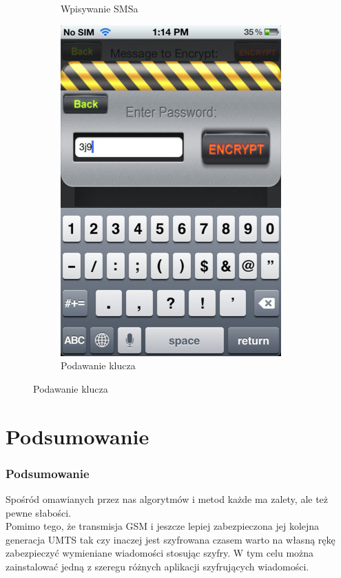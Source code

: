 \documentclass[xcolor=table]{beamer}
\begin{document}
\begin{frame}
\begin{center}
\begin{figure}
\begin{subfigure}[b]{0.4\textwidth}
              \caption{Wpisywanie SMSa}
            \end{subfigure}
            \quad
             \begin{subfigure}[b]{0.4\textwidth}
              \centering
              \includegraphics[width=\textwidth]{secure_texting_2}
              \caption{Podawanie klucza}
            \end{subfigure}       
        \end{figure}
      \end{center}
\end{frame}

\section{Podsumowanie}

\begin{frame}
  \frametitle{Podsumowanie}
Spośród omawianych przez nas algorytmów i metod każde ma zalety, ale też pewne słabości.\\[\baselineskip] Pomimo tego, że transmisja GSM i jeszcze lepiej zabezpieczona jej kolejna generacja UMTS tak czy inaczej jest szyfrowana czasem warto na własną rękę zabezpieczyć wymieniane wiadomości stosując szyfry. W tym celu można zainstalować jedną z szeregu różnych aplikacji szyfrujących wiadomości.

\end{frame}
\end{document}
